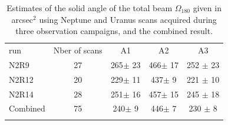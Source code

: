 \begin{table}[!h]
\caption{Estimates of the solid angle of the total beam
  $\Omega_{180}$ given in arcsec$^{2}$ using Neptune and Uranus
  scans acquired during three observation campaigns, and the combined
  result.  }
\label{tab:solid}
\centering
\begin{tabular}{l cccc}
\hline\hline
\noalign{\smallskip}
run  & Nber of scans & %
A1    &    A2   &  A3  \\%
\noalign{\smallskip}
\hline
\noalign{\smallskip}
N2R9     & 27  &  265$\pm$ 23    &  466$\pm$ 17 & 252 $\pm$ 23 \\%
N2R12    & 20  &  229$\pm$ 11    &  437$\pm$  9 & 221 $\pm$ 10 \\%
N2R14    & 28  &  251$\pm$ 16    &  457$\pm$ 15 & 245 $\pm$ 18 \\%
Combined & 75  &  240$\pm$  9    &  446$\pm$  7 & 230 $\pm$  8 \\%
\noalign{\smallskip}
\hline
\end{tabular}
\end{table}

